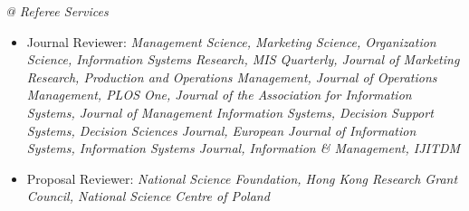 \documentclass[paper=letter,fontsize=10pt]{scrartcl} %
\begin{document}
\noindent\textit{@ Referee Services}
\begin{itemize}
\item Journal Reviewer: \emph{Management Science, Marketing Science, Organization Science, Information Systems Research, MIS Quarterly, Journal of Marketing Research, Production and Operations Management, Journal of Operations Management, PLOS One, Journal of the Association for Information Systems, Journal of Management Information Systems, Decision Support Systems, Decision Sciences Journal, European Journal of Information Systems, Information Systems Journal, Information \& Management, IJITDM}
\item Proposal Reviewer: \emph{National Science Foundation, Hong Kong Research Grant Council, National Science Centre of Poland}
\end{itemize}
\end{document}
